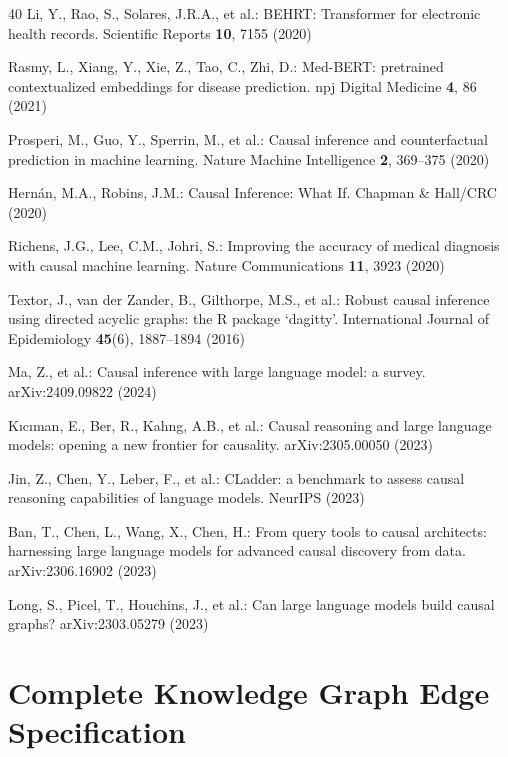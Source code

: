 \documentclass[runningheads]{llncs}
\begin{document}
\begin{thebibliography}{40}
Li, Y., Rao, S., Solares, J.R.A., et al.:
BEHRT: Transformer for electronic health records.
Scientific Reports \textbf{10}, 7155 (2020)

Rasmy, L., Xiang, Y., Xie, Z., Tao, C., Zhi, D.:
Med-BERT: pretrained contextualized embeddings for disease prediction.
npj Digital Medicine \textbf{4}, 86 (2021)

Prosperi, M., Guo, Y., Sperrin, M., et al.:
Causal inference and counterfactual prediction in machine learning.
Nature Machine Intelligence \textbf{2}, 369--375 (2020)

Hern\'{a}n, M.A., Robins, J.M.:
Causal Inference: What If.
Chapman \& Hall/CRC (2020)

Richens, J.G., Lee, C.M., Johri, S.:
Improving the accuracy of medical diagnosis with causal machine learning.
Nature Communications \textbf{11}, 3923 (2020)

Textor, J., van der Zander, B., Gilthorpe, M.S., et al.:
Robust causal inference using directed acyclic graphs: the R package `dagitty'.
International Journal of Epidemiology \textbf{45}(6), 1887--1894 (2016)

Ma, Z., et al.:
Causal inference with large language model: a survey.
arXiv:2409.09822 (2024)

K{\i}c{\i}man, E., Ber, R., Kahng, A.B., et al.:
Causal reasoning and large language models: opening a new frontier
for causality.
arXiv:2305.00050 (2023)

Jin, Z., Chen, Y., Leber, F., et al.:
CLadder: a benchmark to assess causal reasoning capabilities of
language models.
NeurIPS (2023)

Ban, T., Chen, L., Wang, X., Chen, H.:
From query tools to causal architects: harnessing large language
models for advanced causal discovery from data.
arXiv:2306.16902 (2023)

Long, S., Picel, T., Houchins, J., et al.:
Can large language models build causal graphs?
arXiv:2303.05279 (2023)

\end{thebibliography}

\appendix
\section{Complete Knowledge Graph Edge Specification}\label{app:edges}
\end{document}
